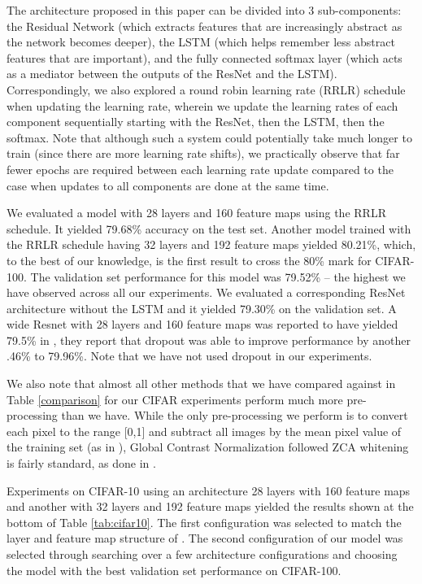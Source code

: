 \documentclass{article}
\begin{document}
The architecture proposed in this paper can be divided into 3 sub-components: the Residual Network (which extracts features that are increasingly abstract as the network becomes deeper), the LSTM (which helps remember less abstract features that are important), and the fully connected softmax layer (which acts as a mediator between the outputs of the ResNet and the LSTM). Correspondingly, we also explored a round robin learning rate (RRLR) schedule when updating the learning rate, wherein we update the learning rates of each component sequentially starting with the ResNet, then the LSTM, then the softmax. Note that although such a system could potentially take much longer to train (since there are more learning rate shifts), we practically observe that far fewer epochs are required between each learning rate update compared to the case when updates to all components are done at the same time.


We evaluated a model with 28 layers and 160 feature maps using the RRLR schedule. It yielded 79.68\% accuracy on the test set. Another model trained with the RRLR schedule having 32 layers and 192 feature maps yielded 80.21\%, which, to the best of our knowledge, is the first result to cross the 80\% mark for CIFAR-100. The validation set performance for this model was 79.52\% -- the highest we have observed across all our experiments. We evaluated a corresponding ResNet architecture without the LSTM and it yielded 79.30\% on the validation set. %
A wide Resnet with 28 layers and 160 feature maps was reported to have yielded 79.5\% in \cite{zagoruyko2016wide}, they report that dropout was able to improve performance by another .46\% to 79.96\%. Note that we have not used dropout in our experiments.


We also note that almost all other methods that we have compared against in Table \ref{comparison} for our CIFAR experiments perform much more pre-processing than we have. While the only pre-processing we perform is to convert each pixel to the range [0,1] and subtract all images by the mean pixel value of the training set (as in \cite{zeiler2013stochastic}), Global Contrast Normalization followed ZCA whitening is fairly standard, as done in \cite{goodfellow2013maxout}.

Experiments on CIFAR-10 using an architecture 28 layers with 160 feature maps and another with 32 layers and 192 feature maps yielded the results shown at the bottom of Table \ref{tab:cifar10}.
The first configuration was selected to match the layer and feature map structure of \cite{zagoruyko2016wide}. The second configuration of our model was selected through searching over a few architecture configurations and choosing the model with the best validation set performance on CIFAR-100. %
\end{document}
